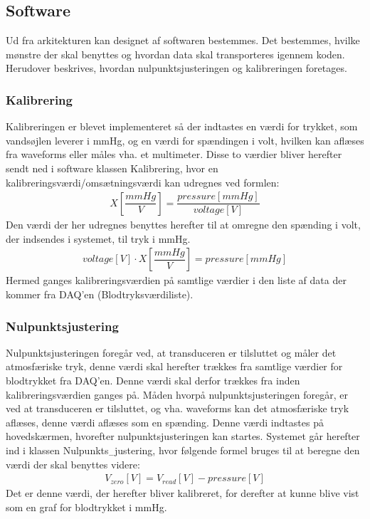 \subsection{Software}
Ud fra arkitekturen kan designet af softwaren bestemmes. Det bestemmes, hvilke mønstre der skal benyttes og hvordan data skal transporteres igennem koden. Herudover beskrives, hvordan nulpunktsjusteringen og kalibreringen foretages.
\subsubsection{Kalibrering}
Kalibreringen er blevet implementeret så der indtastes en værdi for trykket, som vandsøjlen leverer i mmHg, og en værdi for spændingen i volt, hvilken kan aflæses fra waveforms eller måles vha. et multimeter. Disse to værdier bliver herefter sendt ned i software klassen Kalibrering, hvor en kalibreringsværdi/omsætningsværdi kan udregnes ved formlen:
\begin{align}
X\left[\dfrac{mmHg}{V}\right]=\dfrac{pressure \left[mmHg\right]}{voltage \left[V\right]}
\end{align}
Den værdi der her udregnes benyttes herefter til at omregne den spænding i volt, der indsendes i systemet, til tryk i mmHg. 
\begin{align}
voltage \left[V\right]\cdot X\left[\dfrac{mmHg}{V}\right] = pressure \left[mmHg\right]
\end{align}
Hermed ganges kalibreringsværdien på samtlige værdier i den liste af data der kommer fra DAQ'en (Blodtryksværdiliste). 
\subsubsection{Nulpunktsjustering}
Nulpunktsjusteringen foregår ved, at transduceren er tilsluttet og måler det atmosfæriske tryk, denne værdi skal herefter trækkes fra samtlige værdier for blodtrykket fra DAQ'en. Denne værdi skal derfor trækkes fra inden kalibreringsværdien ganges på. Måden hvorpå nulpunktsjusteringen foregår, er ved at transduceren er tilsluttet, og vha. waveforms kan det atmosfæriske tryk aflæses, denne værdi aflæses som en spænding. Denne værdi indtastes på hovedskærmen, hvorefter nulpunktsjusteringen kan startes. Systemet går herefter ind i klassen Nulpunkts$_{-}$justering, hvor følgende formel bruges til at beregne den værdi der skal benyttes videre:
\begin{align}
V_{zero} \left[V\right]=V_{read}\left[V\right]-pressure \left[V\right] 
\end{align}
Det er denne værdi, der herefter bliver kalibreret, for derefter at kunne blive vist som en graf for blodtrykket i mmHg.
